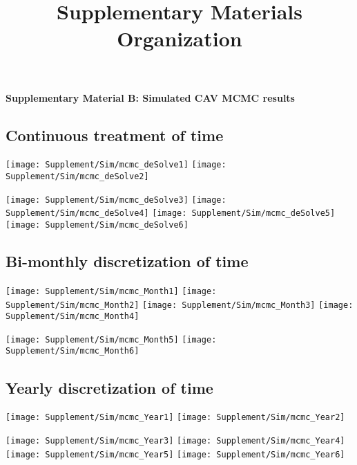 \documentclass{article}
\title{Supplementary Materials Organization}
\date{\vspace{-5ex}}
\begin{document}
\noindent \textbf{\LARGE Supplementary Material B: Simulated CAV MCMC results}\\
\subsection*{Continuous treatment of time}
\begin{center}
    \texttt{[image: Supplement/Sim/mcmc\_deSolve1]}
    \texttt{[image: Supplement/Sim/mcmc\_deSolve2]}
\end{center}
\begin{center}
    \texttt{[image: Supplement/Sim/mcmc\_deSolve3]}
    \texttt{[image: Supplement/Sim/mcmc\_deSolve4]}
    \texttt{[image: Supplement/Sim/mcmc\_deSolve5]}
    \texttt{[image: Supplement/Sim/mcmc\_deSolve6]}
\end{center}

\subsection*{Bi-monthly discretization of time}
\begin{center}
    \texttt{[image: Supplement/Sim/mcmc\_Month1]}
    \texttt{[image: Supplement/Sim/mcmc\_Month2]}
    \texttt{[image: Supplement/Sim/mcmc\_Month3]}
    \texttt{[image: Supplement/Sim/mcmc\_Month4]}
\end{center}
\begin{center}
    \texttt{[image: Supplement/Sim/mcmc\_Month5]}
    \texttt{[image: Supplement/Sim/mcmc\_Month6]}
\end{center}

\subsection*{Yearly discretization of time}
\begin{center}
    \texttt{[image: Supplement/Sim/mcmc\_Year1]}
    \texttt{[image: Supplement/Sim/mcmc\_Year2]}
\end{center}
\begin{center}
    \texttt{[image: Supplement/Sim/mcmc\_Year3]}
        \texttt{[image: Supplement/Sim/mcmc\_Year4]}
            \texttt{[image: Supplement/Sim/mcmc\_Year5]}
                \texttt{[image: Supplement/Sim/mcmc\_Year6]}
\end{center}
\end{document}
